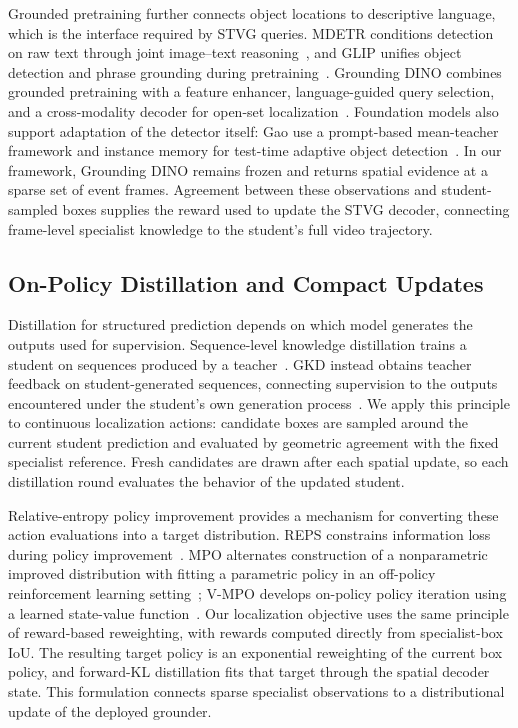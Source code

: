 \documentclass[10pt,twocolumn,letterpaper]{article}
\begin{document}
Grounded pretraining further connects object locations to descriptive
language, which is the interface required by STVG queries.
MDETR conditions detection on raw text through joint image--text
reasoning~\cite{mdetr}, and GLIP unifies object detection and phrase grounding
during pretraining~\cite{glip}.
Grounding DINO combines grounded pretraining with a feature enhancer,
language-guided query selection, and a cross-modality decoder for open-set
localization~\cite{groundingdino}.
Foundation models also support adaptation of the detector itself: Gao
\etal use a prompt-based mean-teacher framework and instance memory for
test-time adaptive object detection~\cite{ttaod}.
In our framework, Grounding DINO remains frozen and returns spatial evidence
at a sparse set of event frames.
Agreement between these observations and student-sampled boxes supplies the
reward used to update the STVG decoder, connecting frame-level specialist
knowledge to the student's full video trajectory.

\subsection{On-Policy Distillation and Compact Updates}

Distillation for structured prediction depends on which model generates
the outputs used for supervision.
Sequence-level knowledge distillation trains a student on sequences produced
by a teacher~\cite{seqkd}.
GKD instead obtains teacher feedback on student-generated sequences,
connecting supervision to the outputs encountered under the student's own
generation process~\cite{gkd}.
We apply this principle to continuous localization actions: candidate boxes
are sampled around the current student prediction and evaluated by
geometric agreement with the fixed specialist reference.
Fresh candidates are drawn after each spatial update, so each distillation
round evaluates the behavior of the updated student.

Relative-entropy policy improvement provides a mechanism for converting
these action evaluations into a target distribution.
REPS constrains information loss during policy improvement~\cite{reps}.
MPO alternates construction of a nonparametric improved distribution with
fitting a parametric policy in an off-policy reinforcement learning
setting~\cite{mpo}; V-MPO develops on-policy policy iteration using a learned
state-value function~\cite{vmpo}.
Our localization objective uses the same principle of reward-based
reweighting, with rewards computed directly from specialist-box IoU.
The resulting target policy is an exponential reweighting of the current box
policy, and forward-KL distillation fits that target through the spatial
decoder state.
This formulation connects sparse specialist observations to a distributional
update of the deployed grounder.
\end{document}

